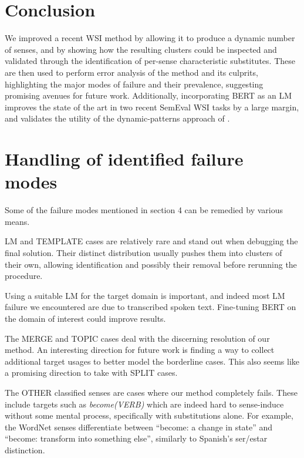 \documentclass[11pt,a4paper]{article}
\begin{document}
\section{Conclusion}
\vspace{-0.4em}
We improved a recent WSI method by allowing it to produce a dynamic number of senses, and by showing how the resulting clusters could be inspected and validated through the identification of per-sense characteristic substitutes. These are then used to perform error analysis of the method and its culprits, highlighting the major modes of failure and their prevalence, suggesting promising avenues for future work.
Additionally, incorporating BERT as an LM improves the state of the art in two recent SemEval WSI tasks by a large margin, and    validates the utility of the dynamic-patterns approach of \citet{amrami2018word}.
 











\appendix



    \newpage
     \section{Handling of identified failure modes} 
Some of the failure modes mentioned in section 4 can be remedied by various means.

LM and TEMPLATE cases are relatively rare and stand out when debugging the final solution. Their distinct distribution usually pushes them into clusters of their own, allowing identification and possibly their removal before rerunning the procedure.


Using a suitable LM for the target domain is important, and indeed most LM
failure we encountered are due to transcribed spoken text. Fine-tuning BERT on the
domain of interest could improve results.

The MERGE and TOPIC cases deal with the discerning resolution of our method. 
An interesting direction for future work is finding a way to collect additional target usages to better model the borderline cases. This also seems like a promising direction to take with SPLIT cases. 

The OTHER classified senses are cases where our method completely fails. These
include targets such as \emph{become(VERB)} which are
indeed hard to sense-induce without some mental process, specifically with substitutions alone. For example, the WordNet senses differentiate between ``become: a change in state'' and ``become: transform into something else'', similarly to Spanish's ser/estar distinction. 
\end{document}
